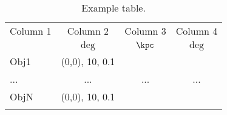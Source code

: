 \begin{table}[ht]
  \begin{center}
  \caption{Example table. }
  \begin{tabular}{lccc}
\hline\hline
\label{tab:example}
Column 1 & Column 2 & Column 3 &  Column 4 \\[3pt]  
     &    $\deg$     & $\kpc$   &  $\deg$ \\[4pt]
\hline
Obj1 & (0,0), 10, 0.1 \\
... & ... & ... & ... \\
ObjN & (0,0), 10, 0.1 \\
\\\hline\hline
\end{tabular}
\end{center}
\end{table}


